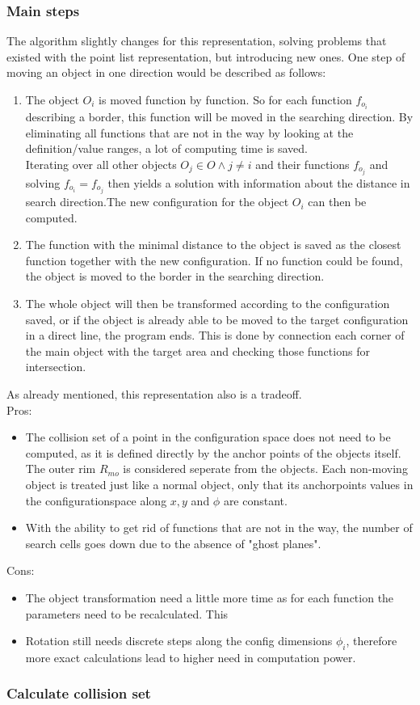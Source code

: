 \subsubsection{Main steps}
The algorithm slightly changes for this representation, solving problems that existed with the point list representation, but introducing new ones. One step of moving an object in one direction would be described as follows:
\begin{enumerate}
\item The object $O_i$ is moved function by function. So for each function $f_{o_i}$ describing a border, this function will be moved in the searching direction. By eliminating all functions that are not in the way by looking at the definition/value ranges, a lot of computing time is saved.\\ 
Iterating over all other objects $O_j \in O \wedge j \neq i$ and their functions $f_{o_j}$ and solving $f_{o_i} = f_{o_j}$ then yields a solution with information about the distance in search direction.The new configuration for the object $O_i$ can then be computed.
\item The function with the minimal distance to the object is saved as the closest function together with the new configuration. If no function could be found, the object is moved to the border in the searching direction.
\item The whole object will then be transformed according to the configuration saved, or if the object is already able to be moved to the target configuration in a direct line, the program ends. This is done by connection each corner of the main object with the target area and checking those functions for intersection.
\end{enumerate}

As already mentioned, this representation also is a tradeoff.\\
Pros:
\begin{itemize}
\item The collision set of a point in the configuration space does not need to be computed, as it is defined directly by the anchor points of the objects itself. The outer rim $R_{mo}$ is considered seperate from the objects. Each non-moving object is treated just like a normal object, only that its anchorpoints values in the configurationspace along $x,y$ and $\phi$ are constant.
\item With the ability to get rid of functions that are not in the way, the number of search cells goes down due to the absence of "ghost planes".
\end{itemize}
Cons:\\
\begin{itemize}
\item The object transformation need a little more time as for each function the parameters need to be recalculated. This 
\item Rotation still needs discrete steps along the config dimensions $\phi_i$, therefore more exact calculations lead to higher need in computation power.
\end{itemize}


\subsubsection{Calculate collision set}